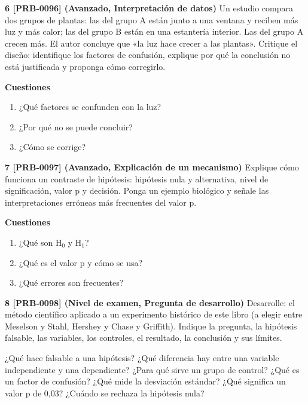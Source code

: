 \documentclass{book}
\begin{document}
\begin{tcolorbox}[title={Ejercicios}, studiumworked, breakable]
\noindent\textbf{6 [PRB-0096] (Avanzado, Interpretación de datos)}
Un estudio compara dos grupos de plantas: las del grupo A están junto a una ventana y reciben más luz y más calor; las del grupo B están en una estantería interior. Las del grupo A crecen más. El autor concluye que «la luz hace crecer a las plantas». Critique el diseño: identifique los factores de confusión, explique por qué la conclusión no está justificada y proponga cómo corregirlo.


\noindent\textbf{Cuestiones}
\begin{enumerate}
\item ¿Qué factores se confunden con la luz?
\item ¿Por qué no se puede concluir?
\item ¿Cómo se corrige?
\end{enumerate}

\noindent\textbf{7 [PRB-0097] (Avanzado, Explicación de un mecanismo)}
Explique cómo funciona un contraste de hipótesis: hipótesis nula y alternativa, nivel de significación, valor p y decisión. Ponga un ejemplo biológico y señale las interpretaciones erróneas más frecuentes del valor p.


\noindent\textbf{Cuestiones}
\begin{enumerate}
\item ¿Qué son H\({}_{0}\) y H\({}_{1}\)?
\item ¿Qué es el valor p y cómo se usa?
\item ¿Qué errores son frecuentes?
\end{enumerate}

\noindent\textbf{8 [PRB-0098] (Nivel de examen, Pregunta de desarrollo)}
Desarrolle: el método científico aplicado a un experimento histórico de este libro (a elegir entre Meselson y Stahl, Hershey y Chase y Griffith). Indique la pregunta, la hipótesis falsable, las variables, los controles, el resultado, la conclusión y sus límites.

\end{tcolorbox}

\begin{tcolorbox}[title={Autoficha}, studiumcheck, breakable]

¿Qué hace falsable a una hipótesis? ¿Qué diferencia hay entre una variable independiente y una dependiente? ¿Para qué sirve un grupo de control? ¿Qué es un factor de confusión? ¿Qué mide la desviación estándar? ¿Qué significa un valor p de 0,03? ¿Cuándo se rechaza la hipótesis nula?

\end{tcolorbox}
\appendix
\end{document}
